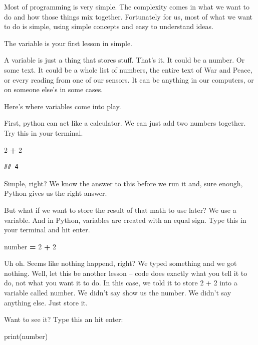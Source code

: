 \documentclass[
]{book}
\newenvironment{Shaded}{\begin{snugshade}}{\end{snugshade}}
\newcommand{\BuiltInTok}[1]{#1}
\newcommand{\DecValTok}[1]{\textcolor[rgb]{0.00,0.00,0.81}{#1}}
\newcommand{\NormalTok}[1]{#1}
\newcommand{\OperatorTok}[1]{\textcolor[rgb]{0.81,0.36,0.00}{\textbf{#1}}}
\begin{document}
Most of programming is very simple. The complexity comes in what we want to do and how those things mix together. Fortunately for us, most of what we want to do is simple, using simple concepts and easy to understand ideas.

The variable is your first lesson in simple.

A variable is just a thing that stores stuff. That's it. It could be a number. Or some text. It could be a whole list of numbers, the entire text of War and Peace, or every reading from one of our sensors. It can be anything in our computers, or on someone else's in some cases.

Here's where variables come into play.

First, python can act like a calculator. We can just add two numbers together. Try this in your terminal.

\begin{Shaded}
\begin{Highlighting}[]
\DecValTok{2} \OperatorTok{+} \DecValTok{2}
\end{Highlighting}
\end{Shaded}

\begin{verbatim}
## 4
\end{verbatim}

Simple, right? We know the answer to this before we run it and, sure enough, Python gives us the right answer.

But what if we want to store the result of that math to use later? We use a variable. And in Python, variables are created with an equal sign. Type this in your terminal and hit enter.

\begin{Shaded}
\begin{Highlighting}[]
\NormalTok{number }\OperatorTok{=} \DecValTok{2} \OperatorTok{+} \DecValTok{2} 
\end{Highlighting}
\end{Shaded}

Uh oh. Seems like nothing happend, right? We typed something and we got nothing. Well, let this be another lesson -- code does exactly what you tell it to do, not what you want it to do. In this case, we told it to store 2 + 2 into a variable called number. We didn't say show us the number. We didn't say anything else. Just store it.

Want to see it? Type this an hit enter:

\begin{Shaded}
\begin{Highlighting}[]
\BuiltInTok{print}\NormalTok{(number)}
\end{Highlighting}
\end{Shaded}
\end{document}
